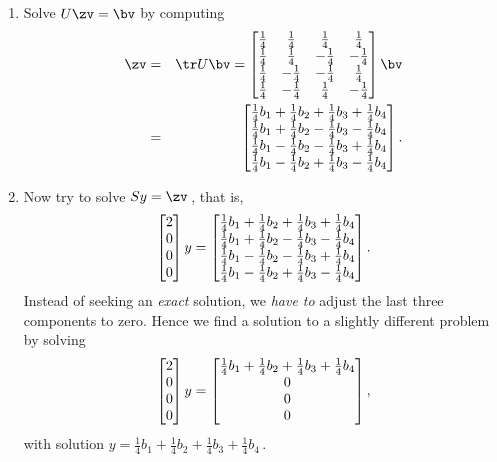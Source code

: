 \begin{example}
\begin{enumerate}
\item Solve \(U\zv=\bv\) by computing 
\begin{eqnarray*}
\zv&=&\tr U\bv
=\begin{bmatrix} 
  \h&\h&\h&\h
\\\h&\h&-\h&-\h
\\\h&-\h&-\h&\h
\\\h&-\h&\h&-\h \end{bmatrix}\bv
\\&=&\begin{bmatrix} \h b_1+\h b_2+\h b_3+\h b_4
\\\h b_1+\h b_2-\h b_3-\h b_4
\\\h b_1-\h b_2-\h b_3+\h b_4
\\\h b_1-\h b_2+\h b_3-\h b_4 \end{bmatrix}.
\end{eqnarray*}

\item  Now try to solve \(Sy=\zv\)\,, that is,
\begin{equation*}
\begin{bmatrix} 2\\0\\0\\0 \end{bmatrix}y
=\begin{bmatrix} \h b_1+\h b_2+\h b_3+\h b_4
\\\h b_1+\h b_2-\h b_3-\h b_4
\\\h b_1-\h b_2-\h b_3+\h b_4
\\\h b_1-\h b_2+\h b_3-\h b_4 \end{bmatrix}.
\end{equation*}
Instead of seeking an \emph{exact} solution,  we \emph{have to} adjust the last three components to zero. 
Hence we find a solution to a slightly different problem by solving
\begin{equation*}
\begin{bmatrix} 2\\0\\0\\0 \end{bmatrix}y
=\begin{bmatrix} \h b_1+\h b_2+\h b_3+\h b_4\\0\\0\\0 \end{bmatrix},
\end{equation*}
\def\h{\frac14}%
with solution \(y=\h b_1+\h b_2+\h b_3+\h b_4\)\,.


\end{enumerate}
\end{example}
